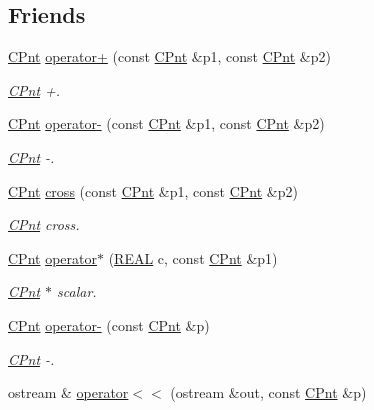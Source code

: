 \subsection*{Friends}
\begin{DoxyCompactItemize}
\item 
\hyperlink{classCPnt}{C\-Pnt} \hyperlink{classCPnt_a793e034bed9900c45412db255d708e84}{operator+} (const \hyperlink{classCPnt}{C\-Pnt} \&p1, const \hyperlink{classCPnt}{C\-Pnt} \&p2)
\begin{DoxyCompactList}\small\item\em \hyperlink{classCPnt}{C\-Pnt} +. \end{DoxyCompactList}\item 
\hyperlink{classCPnt}{C\-Pnt} \hyperlink{classCPnt_a7b0ef59814c5c3ae6a9165df62ab8598}{operator-\/} (const \hyperlink{classCPnt}{C\-Pnt} \&p1, const \hyperlink{classCPnt}{C\-Pnt} \&p2)
\begin{DoxyCompactList}\small\item\em \hyperlink{classCPnt}{C\-Pnt} -\/. \end{DoxyCompactList}\item 
\hyperlink{classCPnt}{C\-Pnt} \hyperlink{classCPnt_ab4553c75d2ac17d0539471baeb0c0237}{cross} (const \hyperlink{classCPnt}{C\-Pnt} \&p1, const \hyperlink{classCPnt}{C\-Pnt} \&p2)
\begin{DoxyCompactList}\small\item\em \hyperlink{classCPnt}{C\-Pnt} cross. \end{DoxyCompactList}\item 
\hyperlink{classCPnt}{C\-Pnt} \hyperlink{classCPnt_a6bf4a1152989f36cdb084e617a81214b}{operator$\ast$} (\hyperlink{util_8h_a5821460e95a0800cf9f24c38915cbbde}{R\-E\-A\-L} c, const \hyperlink{classCPnt}{C\-Pnt} \&p1)
\begin{DoxyCompactList}\small\item\em \hyperlink{classCPnt}{C\-Pnt} $\ast$ scalar. \end{DoxyCompactList}\item 
\hyperlink{classCPnt}{C\-Pnt} \hyperlink{classCPnt_a77ba614aeb115f5ab29247677cc4fa05}{operator-\/} (const \hyperlink{classCPnt}{C\-Pnt} \&p)
\begin{DoxyCompactList}\small\item\em \hyperlink{classCPnt}{C\-Pnt} -\/. \end{DoxyCompactList}\item 
ostream \& \hyperlink{classCPnt_a5d9fde839f5480f04e4b64a9621e3370}{operator$<$$<$} (ostream \&out, const \hyperlink{classCPnt}{C\-Pnt} \&p)

\end{DoxyCompactItemize}
